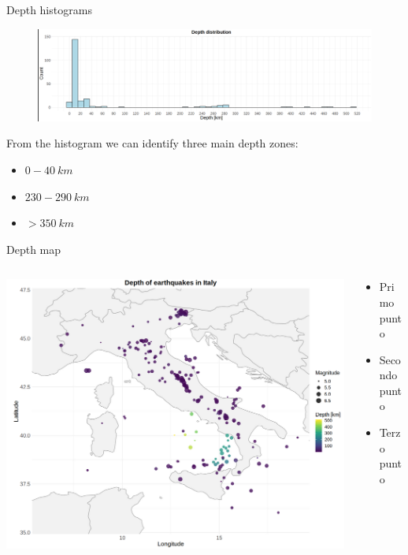 \documentclass[aspectratio=43]{beamer}
\begin{document}
\begin{frame}{Depth histograms}
	\begin{figure}[t]
		\centering
		\includegraphics[width=1\textwidth]{EQ_images_ben/eq_hist_depth.png}
	\end{figure}
	
	From the histogram we can identify three main depth zones: \pause
	\begin{itemize} 
		\item $0-40 \ km$ \pause
		\item $230-290 \ km$ \pause
		\item $> 350 \ km$ 
	\end{itemize}	
\end{frame}


\begin{frame}{Depth map}
	
\begin{columns}
	
	\begin{column}{0.8\textwidth}
		\includegraphics[width=1\textwidth]{EQ_images_ben/eq_depth_map.png}
	\end{column}
	
	\begin{column}{0.6\textwidth}
		\begin{itemize}
			\item Primo punto
			\item Secondo punto
			\item Terzo punto
		\end{itemize}
	\end{column}
	
\end{columns}
	
\end{frame}
\end{document}
